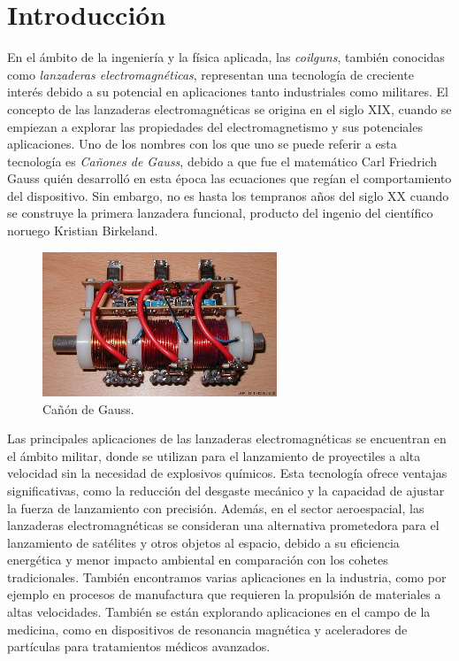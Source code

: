 \section{Introducción}
\label{sec:introduccion}

En el ámbito de la ingeniería y la física aplicada, las \textit{coilguns}, también conocidas como \textit{lanzaderas electromagnéticas}, representan una tecnología de creciente interés debido a su potencial en aplicaciones tanto industriales como militares. El concepto de las lanzaderas electromagnéticas se origina en el siglo XIX, cuando se empiezan a explorar las propiedades del electromagnetismo y sus potenciales aplicaciones. Uno de los nombres con los que uno se puede referir a esta tecnología es \textit{Cañones de Gauss}, debido a que fue el matemático Carl Friedrich Gauss quién desarrolló en esta época las ecuaciones que regían el comportamiento del dispositivo. Sin embargo, no es hasta los tempranos años del siglo XX cuando se construye la primera lanzadera funcional, producto del ingenio del científico noruego Kristian Birkeland.\citep{introCoilGun}

\begin{figure}[h]
    \centering
    \includegraphics[width=7cm]{FigurasMemoria/fig1coilgunIntro.jpeg}
    \caption{Cañón de Gauss.}
    \label{fig:1} %
\end{figure}

Las principales aplicaciones de las lanzaderas electromagnéticas se encuentran en el ámbito militar, donde se utilizan para el lanzamiento de proyectiles a alta velocidad sin la necesidad de explosivos químicos. Esta tecnología ofrece ventajas significativas, como la reducción del desgaste mecánico y la capacidad de ajustar la fuerza de lanzamiento con precisión. Además, en el sector aeroespacial, las lanzaderas electromagnéticas se consideran una alternativa prometedora para el lanzamiento de satélites y otros objetos al espacio, debido a su eficiencia energética y menor impacto ambiental en comparación con los cohetes tradicionales. También encontramos varias aplicaciones en la industria, como por ejemplo en procesos de manufactura que requieren la propulsión de materiales a altas velocidades. También se están explorando aplicaciones en el campo de la medicina, como en dispositivos de resonancia magnética y aceleradores de partículas para tratamientos médicos avanzados. \citep{inproceedings}

